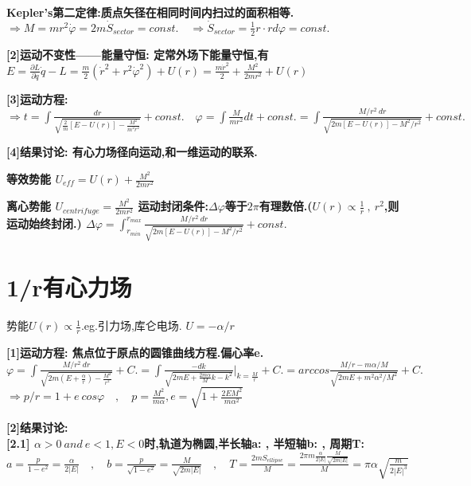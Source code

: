         \bf{Kepler's第二定律}:质点矢径在相同时间内扫过的面积相等.
            $\Rightarrow M = m r^2 \dot \varphi = 2 m \dot S_{sector} = const.\quad \Rightarrow \dot S_{sector} = \frac{1}{2} r \cdot r d\varphi = const.$
    
        \bf{[2]运动不变性——能量守恒}: 定常外场下能量守恒,有
            $E = \frac{\partial L}{\partial \dot q}\dot q - L = \frac{m}{2} (\dot r^2 + r^2 \dot \varphi ^2) + U(r) = \frac{m \dot r^2}{2} + \frac{M^2}{2mr^2} + U(r)$
    
        \bf{[3]运动方程}:
            $\Rightarrow t = \int \frac{d r}{\sqrt{\frac{2}{m}[E-U(r)] - \frac{M^2}{m^2 r^2}}} + const. \quad \varphi = \int \frac{M}{m r^2} d t  + const.= \int \frac{M/r^2\ dr}{\sqrt{2m [E-U(r)] - M^2/r^2}} + const.$
    
        \bf{[4]结果讨论}: 有心力场径向运动,和一维运动的联系.
    
        \bf{等效势能}
            $U_{eff} = U(r) + \frac{M^2}{2mr^2}$
    
        \bf{离心势能}
            $U_{centrifuge} = \frac{M^2}{2mr^2}$
            运动封闭条件:$\Delta \varphi$等于$2\pi$有理数倍.\quad($U(r) \propto \frac{1}{r}\ ,\ r^2$,则运动始终封闭.)
            $\Delta \varphi = \int_{r_{min}} ^{r_{max}} \frac{M/r^2\ dr}{\sqrt{2m [E-U(r)] - M^2/r^2}} + const.$
    

        \section{1/r有心力场}
        势能$U(r) \propto \frac{1}{r}$.\quad eg.引力场,库仑电场.
            $U = - \alpha / r$
            
        \bf{[1]运动方程}: 焦点位于原点的圆锥曲线方程.\quad 偏心率e.
            $\varphi = \int \frac{M/r^2\ dr}{\sqrt{2m (E+\frac{\alpha}{r}) - \frac{M^2}{r^2}}} + C. = \int \frac{-dk}{\sqrt{2mE + \frac{2m\alpha}{M}k - k^2}}|_{k = \frac{M}{r}} + C. = arccos\frac{M/r - m\alpha /M}{\sqrt{2mE + m^2 \alpha ^2 /M^2}} + C.$
            $\Rightarrow p/r = 1 + e \ cos \varphi \quad , \quad p = \frac{M^2}{m\alpha} , e = \sqrt{1 + \frac{2 E M^2}{m \alpha^2}}$
            
        \bf{[2]结果讨论}: \\
        
        \bf{[2.1] $\alpha > 0\ and\ e<1, E<0$时,轨道为椭圆}\quad,半长轴a: \quad , 半短轴b: \quad , 周期T:
        $a = \frac{p}{1-e^2} = \frac{\alpha}{2|E|} \quad , \quad b = \frac{p}{\sqrt{1-e^2}} = \frac{M}{\sqrt{2m|E|}} \quad , \quad T = \frac{2mS_{ellipse}}{M} = \frac{2\pi m \frac{\alpha}{2|E|} \frac{M}{\sqrt{2m|E|}}}{M} = \pi \alpha \sqrt{\frac{m}{2|E|^3}} $
        
